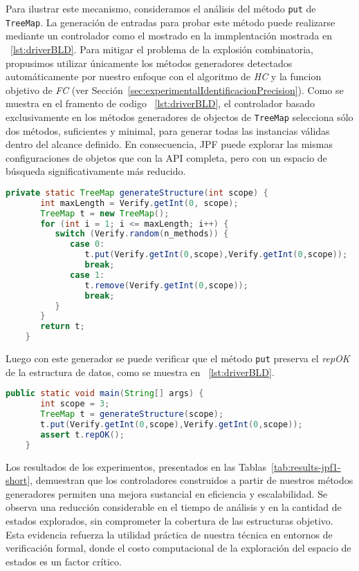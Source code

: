 Para ilustrar este mecanismo, consideramos el análisis del método \texttt{put} de \texttt{TreeMap}.
La generación de entradas para probar este método puede realizarse mediante un controlador como el mostrado en la immplentación mostrada en ~\ref{lst:driverBLD}.
Para mitigar el problema de la explosión combinatoria, propusimos utilizar únicamente los métodos generadores 
detectados automáticamente por nuestro enfoque con el algoritmo de \emph{HC} y la funcion objetivo de \emph{FC} (ver Sección~\ref{sec:experimentalIdentificacionPrecision}). 
Como se muestra en el framento de codigo ~\ref{lst:driverBLD}, el controlador basado exclusivamente en los métodos generadores de objectos de 
\texttt{TreeMap} selecciona sólo dos métodos, suficientes y minimal, para generar todas las instancias 
válidas dentro del alcance definido. En consecuencia, JPF puede explorar las mismas configuraciones 
de objetos que con la API completa, pero con un espacio de búsqueda significativamente más reducido.
\\
\begin{lstlisting}[language=Java,caption={Controlador con los métodos generadores de objectos},label={lst:driverBLD},captionpos=b]
    private static TreeMap generateStructure(int scope) {
       int maxLength = Verify.getInt(0, scope);
       TreeMap t = new TreeMap();
       for (int i = 1; i <= maxLength; i++) {
          switch (Verify.random(n_methods)) {
             case 0:
                t.put(Verify.getInt(0,scope),Verify.getInt(0,scope));
                break;
             case 1:
                t.remove(Verify.getInt(0,scope));
                break;						
          }
       }
       return t;
    }
\end{lstlisting}

Luego con este generador se puede verificar que el método \texttt{put} preserva el \emph{repOK} de la estructura de datos, como se muestra en ~\ref{lst:driverBLD}.

\begin{lstlisting}[caption={Probando el método put de TreeMap con JPF},label={lst:driverBLD},language=Java,captionpos=b]
    public static void main(String[] args) {
       int scope = 3;
       TreeMap t = generateStructure(scope);
       t.put(Verify.getInt(0,scope),Verify.getInt(0,scope));
       assert t.repOK();
    }
\end{lstlisting}

Los resultados de los experimentos, presentados en las Tablas~\ref{tab:results-jpf1-short}, demuestran que los controladores construidos a partir de nuestros 
métodos generadores permiten una mejora sustancial en eficiencia y escalabilidad. Se observa una reducción considerable en el tiempo de análisis y en la cantidad de estados explorados, sin 
comprometer la cobertura de las estructuras objetivo. Esta evidencia refuerza la utilidad práctica 
de nuestra técnica en entornos de verificación formal, donde el costo computacional de la exploración 
del espacio de estados es un factor crítico.



